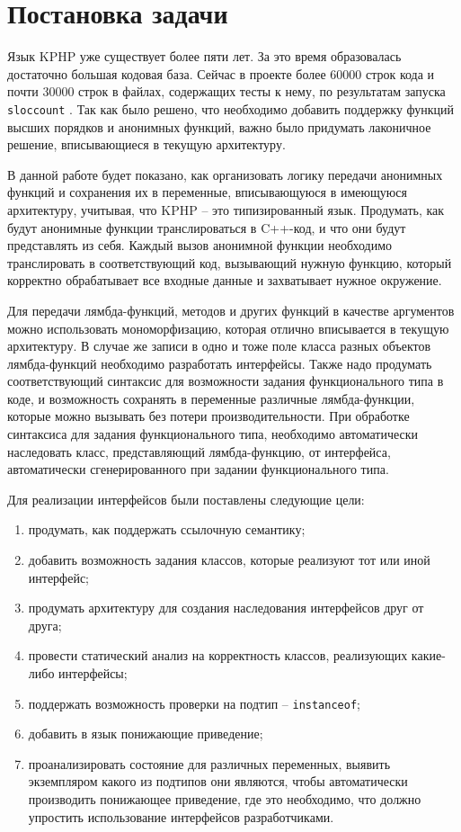 
\startrelatedwork
\chapter{Постановка задачи}
Язык KPHP уже существует более пяти лет.
За это время образовалась достаточно большая кодовая база.
Сейчас в проекте более 60000 строк кода и почти 30000 строк в файлах, содержащих тесты к нему, по результатам запуска \verb|sloccount| \cite{sloccount}.
Так как было решено, что необходимо добавить поддержку функций высших порядков и анонимных функций, важно было придумать лаконичное решение, вписывающиеся в текущую архитектуру.

В данной работе будет показано, как организовать логику передачи анонимных функций и сохранения их в переменные, вписывающуюся в имеющуюся архитектуру, учитывая, что KPHP -- это типизированный язык.
Продумать, как будут анонимные функции транслироваться в C++-код, и что они будут представлять из себя.
Каждый вызов анонимной функции необходимо транслировать в соответствующий код, вызывающий нужную функцию, который корректно обрабатывает все входные данные и захватывает нужное окружение.

Для передачи лямбда-функций, методов и других функций в качестве аргументов можно использовать мономорфизацию, которая отлично вписывается в текущую архитектуру.
В случае же записи в одно и тоже поле класса разных объектов лямбда-функций необходимо разработать интерфейсы.
Также надо продумать соответствующий синтаксис для возможности задания функционального типа в коде, и возможность сохранять в переменные различные лямбда-функции, которые можно вызывать без потери производительности.
При обработке синтаксиса для задания функционального типа, необходимо автоматически наследовать класс, представляющий лямбда-функцию, от интерфейса, автоматически сгенерированного при задании функционального типа. 

Для реализации интерфейсов были поставлены следующие цели:
\begin{enumerate}
  \item продумать, как поддержать ссылочную семантику;
  \item добавить возможность задания классов, которые реализуют тот или иной интерфейс;
  \item продумать архитектуру для создания наследования интерфейсов друг от друга;
  \item провести статический анализ на корректность классов, реализующих какие-либо интерфейсы;
  \item поддержать возможность проверки на подтип -- \verb|instanceof|;
  \item добавить в язык понижающие приведение;
  \item проанализировать состояние для различных переменных, выявить экземпляром какого из подтипов они являются, чтобы автоматически производить понижающее приведение, где это необходимо, что должно упростить использование интерфейсов разработчиками.
\end{enumerate}

